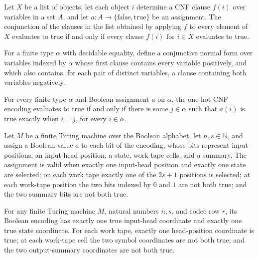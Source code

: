 \begin{theorem}
\label{Complexity.codecCnf_eval_map}
\leanok
{}
Let $X$ be a list of objects, let each object $i$ determine a CNF clause $f(i)$ over
variables in a set $A$, and let $a:A\to\{\mathrm{false},\mathrm{true}\}$ be an
assignment. The conjunction of the clauses in the list obtained by applying $f$ to every
element of $X$ evaluates to true if and only if every clause $f(i)$ for $i\in X$
evaluates to true.
\end{theorem}

\begin{definition}
\label{Complexity.codecOneHot}
\leanok
For a finite type $\alpha$ with decidable equality, define a conjunctive normal form
over variables indexed by $\alpha$ whose first clause contains every variable
positively, and which also contains, for each pair of distinct variables, a clause
containing both variables negatively.
\end{definition}

\begin{theorem}
\label{Complexity.codecOneHot_eval}
\leanok
{}
For every finite type $\alpha$ and Boolean assignment $a$ on $\alpha$, the one-hot CNF
encoding evaluates to true if and only if there is some $j\in\alpha$ such that $a(i)$ is
true exactly when $i=j$, for every $i\in\alpha$.
\end{theorem}

\begin{definition}
\label{Complexity.codecBitsValid}
\leanok
{}
Let $M$ be a finite Turing machine over the Boolean alphabet, let $n,s\in\mathbb{N}$,
and assign a Boolean value $a$ to each bit of the encoding, whose bits represent input
positions, an input-head position, a state, work-tape cells, and a summary. The
assignment is valid when exactly one input-head position and exactly one state are
selected; on each work tape exactly one of the $2s+1$ positions is selected; at each
work-tape position the two bits indexed by $0$ and $1$ are not both true; and the two
summary bits are not both true.
\end{definition}

\begin{theorem}
\label{Complexity.codecRowBits_valid}
\leanok
{}
For any finite Turing machine $M$, natural numbers $n,s$, and codec row $r$, its Boolean
encoding has exactly one true input-head coordinate and exactly one true state
coordinate. For each work tape, exactly one head-position coordinate is true; at each
work-tape cell the two symbol coordinates are not both true; and the two output-summary
coordinates are not both true.
\end{theorem}

